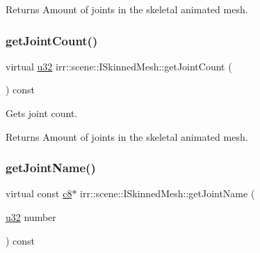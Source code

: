 \begin{DoxyReturn}{Returns}
Amount of joints in the skeletal animated mesh. 
\end{DoxyReturn}
\mbox{\label{classirr_1_1scene_1_1ISkinnedMesh_a7715fb82ffec225d2fd9b8aa860e3c38}} 
\subsubsection{\texorpdfstring{get\+Joint\+Count()}{getJointCount()}\hspace{0.1cm}{\footnotesize\ttfamily [2/2]}}
{\footnotesize\ttfamily virtual \hyperlink{namespaceirr_a0416a53257075833e7002efd0a18e804}{u32} irr\+::scene\+::\+I\+Skinned\+Mesh\+::get\+Joint\+Count (\begin{DoxyParamCaption}{ }\end{DoxyParamCaption}) const\hspace{0.3cm}{\ttfamily [pure virtual]}}



Gets joint count. 

\begin{DoxyReturn}{Returns}
Amount of joints in the skeletal animated mesh. 
\end{DoxyReturn}
\mbox{\label{classirr_1_1scene_1_1ISkinnedMesh_ab28aed78a7e2eeaa20ba7eb0eb082ba4}} 
\subsubsection{\texorpdfstring{get\+Joint\+Name()}{getJointName()}\hspace{0.1cm}{\footnotesize\ttfamily [1/2]}}
{\footnotesize\ttfamily virtual const \hyperlink{namespaceirr_a9395eaea339bcb546b319e9c96bf7410}{c8}$\ast$ irr\+::scene\+::\+I\+Skinned\+Mesh\+::get\+Joint\+Name (\begin{DoxyParamCaption}\item[{\hyperlink{namespaceirr_a0416a53257075833e7002efd0a18e804}{u32}}]{number }\end{DoxyParamCaption}) const\hspace{0.3cm}{\ttfamily [pure virtual]}}



